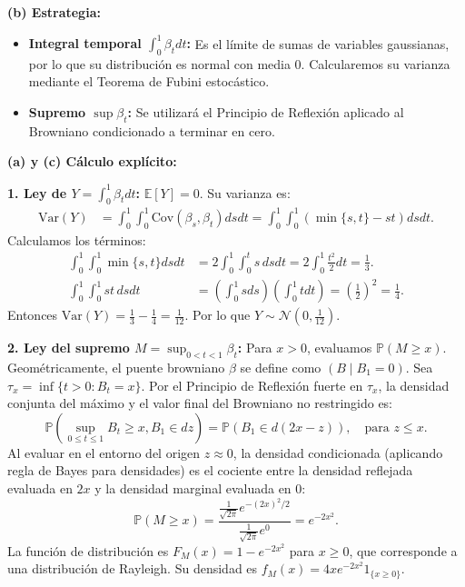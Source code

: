 \documentclass[11pt, letterpaper]{article}
\begin{document}
\begin{solucion}
    \textbf{(b) Estrategia:}
    \begin{itemize}
        \item[(i)] \textbf{Integral temporal $\int_0^1 \beta_t dt$:} Es el límite de sumas de variables gaussianas, por lo que su distribución es normal con media 0. Calcularemos su varianza mediante el Teorema de Fubini estocástico.
        \item[(ii)] \textbf{Supremo $\sup \beta_t$:} Se utilizará el Principio de Reflexión aplicado al Browniano condicionado a terminar en cero.
    \end{itemize}

    \textbf{(a) y (c) Cálculo explícito:}

    \textbf{1. Ley de $Y = \int_0^1 \beta_t dt$:}
    $\mathbb{E}[Y] = 0$. Su varianza es:
    \begin{align*}
        \text{Var}(Y) &= \int_0^1 \int_0^1 \text{Cov}(\beta_s, \beta_t) ds dt = \int_0^1 \int_0^1 (\min\{s,t\} - st) ds dt.
    \end{align*}
    Calculamos los términos:
    \begin{align*}
        \int_0^1 \int_0^1 \min\{s,t\} ds dt &= 2 \int_0^1 \int_0^t s \, ds dt = 2 \int_0^1 \frac{t^2}{2} dt = \frac{1}{3}. \\
        \int_0^1 \int_0^1 st \, ds dt &= \left( \int_0^1 s ds \right) \left( \int_0^1 t dt \right) = \left(\frac{1}{2}\right)^2 = \frac{1}{4}.
    \end{align*}
    Entonces $\text{Var}(Y) = \frac{1}{3} - \frac{1}{4} = \frac{1}{12}$. Por lo que $Y \sim \mathcal{N}(0, \frac{1}{12})$.

    \textbf{2. Ley del supremo $M = \sup_{0<t<1} \beta_t$:}
    Para $x > 0$, evaluamos $\mathbb{P}(M \ge x)$.
    Geométricamente, el puente browniano $\beta$ se define como $(B \mid B_1 = 0)$.
    Sea $\tau_x = \inf\{t > 0 : B_t = x\}$. Por el Principio de Reflexión fuerte en $\tau_x$, la densidad conjunta del máximo y el valor final del Browniano no restringido es:
    \[ \mathbb{P}(\sup_{0\le t \le 1} B_t \ge x, B_1 \in dz) = \mathbb{P}(B_1 \in d(2x - z)), \quad \text{para } z \le x. \]
    Al evaluar en el entorno del origen $z \approx 0$, la densidad condicionada (aplicando regla de Bayes para densidades) es el cociente entre la densidad reflejada evaluada en $2x$ y la densidad marginal evaluada en $0$:
    \[ \mathbb{P}(M \ge x) = \frac{\frac{1}{\sqrt{2\pi}} e^{-(2x)^2/2}}{\frac{1}{\sqrt{2\pi}} e^0} = e^{-2x^2}. \]
    La función de distribución es $F_M(x) = 1 - e^{-2x^2}$ para $x \ge 0$, que corresponde a una distribución de Rayleigh. Su densidad es $f_M(x) = 4x e^{-2x^2} 1_{\{x \ge 0\}}$.
\end{solucion}
\end{document}

